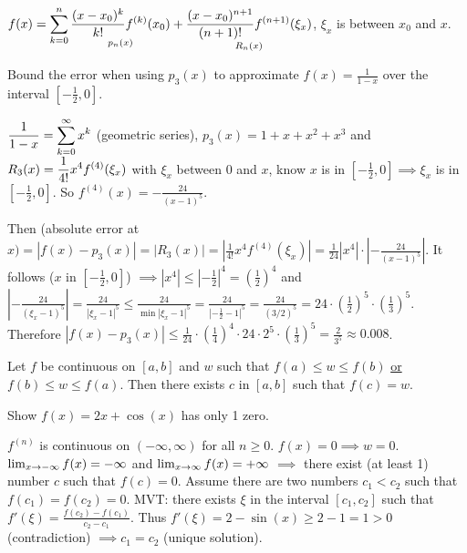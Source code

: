 \documentclass[]{article}
\begin{document}
\begin{recall}
$\displaystyle f(x) = \sum_{k=0}^n \underset{p_n(x)}{\frac{(x-x_0)^k}{k!} f^{(k)}(x_0)} + \underset{R_n(x)}{\frac{(x-x_0)^{n+1}}{(n+1)!} f^{(n+1)}(\xi_x)}$,
$\xi_x$ is between $x_0$ and $x$.
\end{recall}

\begin{example}
	Bound the error when using $p_3(x)$ to approximate $f(x) = \frac{1}{1-x}$ over the interval $[-\frac12,0]$.
\end{example}
\begin{fact}
	$\displaystyle\frac{1}{1-x} = \sum_{k=0}^\infty x^k$ (geometric series), $p_3(x) = 1+x+x^2+x^3$ and $\displaystyle R_3(x) = \frac1{4!} x^4 f^{(4)}(\xi_x)$ with $\xi_x$ between 0 and $x$, know $x$ is in $[-\frac12,0] \implies \xi_x$ is in $[-\frac12,0]$.
	So $f^{(4)}(x) = -\frac{24}{(x-1)^5}$.
\end{fact}
Then (absolute error at $\displaystyle x) = |f(x)-p_3(x)| = |R_3(x)| = \left|\frac1{4!} x^4 f^{(4)}(\xi_x)\right| = \frac1{24}|x^4|\cdot\left|-\frac{24}{(x-1)^5}\right|$.
	It follows ($x$ in $[-\frac12,0]$) $\displaystyle \implies |x^4|\leq \left|-\frac12\right|^4 = \left(\frac12\right)^4$
	and $\displaystyle\left|-\frac{24}{(\xi_x-1)^5}\right| = \frac{24}{|\xi_x-1|^5} \leq \frac{24}{\min|\xi_x-1|^5} = \frac{24}{|-\frac12-1|^5} = \frac{24}{(3/2)^5} = 24\cdot\left(\frac12\right)^5\cdot\left(\frac13\right)^5$.
	Therefore $\displaystyle|f(x)-p_3(x)| \leq \frac1{24}\cdot\left(\frac14\right)^4\cdot 24\cdot 2^5\cdot\left(\frac13\right)^5 = \frac2{3^5}\approx 0.008$.

\begin{theorem}
	Let $f$ be continuous on $[a,b]$ and $w$ such that $f(a)\leq w\leq f(b)$ \ul{or} $f(b)\leq w\leq f(a)$.
	Then there exists $c$ in $[a,b]$ such that $f(c)=w$.
\end{theorem}
\begin{example}
	Show $f(x) = 2x+\cos(x)$ has only 1 zero.

	$f^{(n)}$ is continuous on $(-\infty,\infty)$ for all $n\geq 0$.
	 $f(x)=0 \implies w=0$.
	$\lim_{x\rightarrow-\infty} f(x) = -\infty$ and $\lim_{x\rightarrow\infty} f(x) = +\infty$ $\implies$ there exist (at least 1) number $c$ such that $f(c) = 0$.
	Assume there are two numbers $c_1<c_2$ such that $f(c_1)=f(c_2)=0$.
	MVT: there exists $\xi$ in the interval $[c_1,c_2]$ such that $f'(\xi) = \frac{f(c_2)-f(c_1)}{c_2-c_1}$. 
	Thus $f'(\xi) = 2-\sin(x) \geq 2-1 = 1>0$ (contradiction) $\implies c_1=c_2$ (unique solution).
\end{example}
\end{document}
